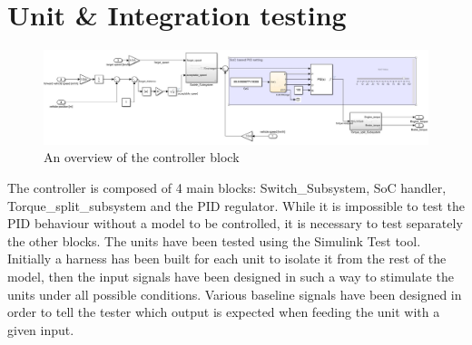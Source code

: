 \documentclass[12pt,a4paper]{report}
\begin{document}
\section{Unit \& Integration testing}
\begin{figure}[!h]
	\centering
	\includegraphics[scale=0.34]{Controller_overview.jpg}
	\caption{An overview of the controller block}
	\label{Controller_overview}
\end{figure}
The controller is composed of 4 main blocks: Switch\_Subsystem, SoC handler,\\ Torque\_split\_subsystem and the PID regulator.
While it is impossible to test the PID behaviour without a model to be controlled, it is necessary to test separately the other blocks.
The units have been tested using the Simulink Test tool. Initially a harness has been built for each unit to isolate it from the rest of the model, then the input signals have been designed in such a way to stimulate the units under all possible conditions. Various baseline signals have been designed in order to tell the tester which output is expected when feeding the unit with a given input. 
\newpage
\end{document}
